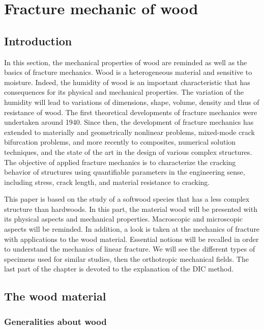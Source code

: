 \chapter{Fracture mechanic of wood}
\label{Chapter1}

\section{Introduction}

In this section, the mechanical properties of wood are reminded as well as the basics of fracture mechanics. 
Wood is a heterogeneous material and sensitive to moisture. Indeed, the humidity of wood is an important characteristic that has consequences for its physical and mechanical properties. The variation of the humidity will lead to variations of dimensions, shape, volume, density and thus of resistance of wood. 
The first theoretical developments of fracture mechanics were undertaken around 1940. Since then, the development of fracture mechanics has extended to materially and geometrically nonlinear problems, mixed-mode crack bifurcation problems, and more recently to composites, numerical solution techniques, and the state of the art in the design of various complex structures. The objective of applied fracture mechanics is to characterize the cracking behavior of structures using quantifiable parameters in the engineering sense, including stress, crack length, and material resistance to cracking.

This paper is based on the study of a softwood species that has a less complex structure than hardwoods. In this part, the material wood will be presented with its physical aspects and mechanical properties. Macroscopic and microscopic aspects will be reminded.
In addition, a look is taken at the mechanics of fracture with applications to the wood material. Essential notions will be recalled in order to understand the mechanics of linear fracture. We will see the different types of specimens used for similar studies, then the orthotropic mechanical fields. The last part of the chapter is devoted to the explanation of the DIC method.

\section{The wood material}

\subsection{Generalities about wood}

